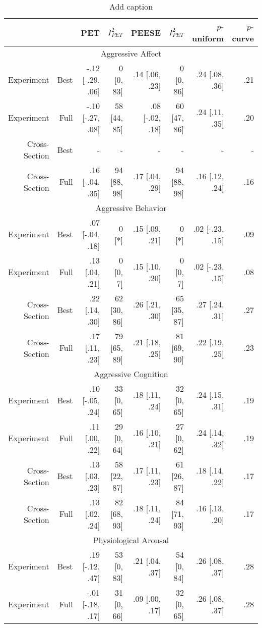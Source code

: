 \begin{table}[htbp]
  \centering
  \caption{Add caption}
    \begin{tabular}{rrrrrrrr}
    \toprule
          &       & PET   & $I^2_{PET}$ & PEESE & $I^2_{PET}$ & $p$-uniform & $p$-curve \\
    \midrule
    \multicolumn{8}{c}{Aggressive Affect} \\
    Experiment & Best  & -.12 [-.29, .06] & 0 [0, 83] & .14 [.06, .23] &  0 [0, 86] & .24 [.08, .36] & .21 \\
    Experiment & Full  & -.10 [-.27, .08] & 58 [44, 85] & .08 [-.02, .18] & 60 [47, 86] & .24 [.11, .35] & .20 \\
    Cross-Section & Best  & -     & -     & -     & -     & -     & - \\
    Cross-Section & Full  &  .16 [-.04, .35] & 94 [88, 98] & .17 [.04, .29] & 94 [88, 98] & .16 [.12, .24] & .16 \\
    \multicolumn{8}{c}{Aggressive Behavior} \\
    Experiment & Best  &  .07 [-.04, .18] &  0 [*] & .15 [.09, .21] &  0 [*] & .02 [-.23, .15] & .09 \\
    Experiment & Full  &  .13 [.04, .21] & 0 [0, 7] & .15 [.10, .20] & 0 [0, 7] & .02 [-.23, .15] & .08 \\
    Cross-Section & Best  &  .22 [.14, .30] & 62 [30, 86] & .26 [.21, .30] & 65 [35, 87] & .27 [.24, .31] & .27 \\
    Cross-Section & Full  &  .17 [.11, .23] & 79 [65, 89] & .21 [.18, .25] & 81 [69, 90] & .22 [.19, .25] & .23 \\
    \multicolumn{8}{c}{Aggressive Cognition} \\
    Experiment & Best  &  .10 [-.05, .24] & 33 [0, 65] & .18 [.11, .24] & 32 [0, 65] & .24 [.15, .31] & .19 \\
    Experiment & Full  &  .11 [.00, .22] & 29 [0, 64] & .16 [.10, .21] & 27 [0, 62] & .24 [.14, .32] & .19 \\
    Cross-Section & Best  &  .13 [.03, .23] & 58 [22, 87] & .17 [.11, .23] & 61 [26, 87] & .18 [.14, .22] & .17 \\
    Cross-Section & Full  &  .13 [.02, .24] & 82 [68, 93] & .18 [.11, .24] & 84 [71, 93] & .16 [.13, .20] & .17 \\
    \multicolumn{8}{c}{Physiological Arousal} \\
    Experiment & Best  &  .19 [-.12, .47] & 53 [0, 83] & .21 [.04, .37] & 54 [0, 84] & .26 [.08, .37] & .28 \\
    Experiment & Full  & -.01 [-.18, .17] & 31 [0, 66] & .09 [.00, .17] & 32 [0, 65] & .26 [.08, .37] & .28 \\
    \bottomrule
    \end{tabular}%
  \label{tab:addlabel}%
\end{table}%
